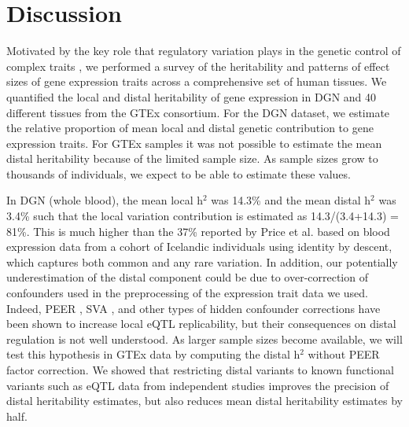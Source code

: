 \documentclass[10pt,letterpaper]{article}
\begin{document}

\section*{Discussion}
Motivated by the key role that regulatory variation plays in the genetic control of complex traits \cite{Nicolae_2010,Nica_2010,Gusev_2014}, we performed a survey of the heritability and patterns of effect sizes of gene expression traits across a comprehensive set of human tissues. We quantified the local and distal heritability of gene expression in DGN and 40 different tissues from the GTEx consortium. For the DGN dataset, we estimate the relative proportion of mean local and distal genetic contribution to gene expression traits. For GTEx samples it was not possible to estimate the mean distal heritability because of the limited sample size. As sample sizes grow to thousands of individuals, we expect to be able to estimate these values.

In DGN (whole blood), the mean local h$^2$ was 14.3\% and the mean distal h$^2$ was 3.4\% such that the local variation contribution is estimated as 14.3/(3.4+14.3) = 81\%. This is much higher than the 37\% reported by Price et al. \cite{Price_2011} based on blood expression data from a cohort of Icelandic individuals using identity by descent, which captures both common and any rare variation. In addition, our potentially underestimation of the distal component could be due to over-correction of confounders used in the preprocessing of the expression trait data we used. Indeed, PEER \cite{Stegle_2012}, SVA \cite{Leek_2007}, and other types of hidden confounder corrections have been shown to increase local eQTL replicability, but their consequences on distal regulation is not well understood.  As larger sample sizes become available, we will test this hypothesis in GTEx data by computing the distal h$^2$ without PEER factor correction. We showed that restricting distal variants to known functional variants such as eQTL data from independent studies improves the precision of distal heritability estimates, but also reduces mean distal heritability estimates by half.
\end{document}
